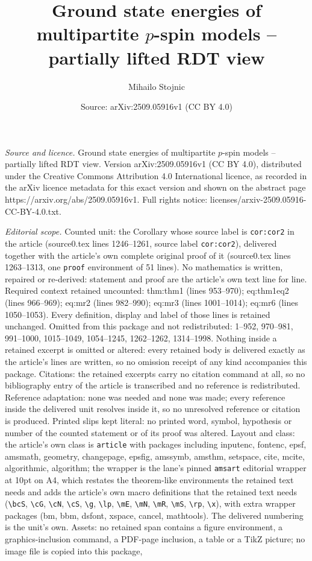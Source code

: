 \documentclass[10pt,a4paper]{amsart}
\title[Ground state energies of multipartite $p$-spin models -- par]{Ground state energies of multipartite $p$-spin models -- partially lifted RDT view}
\author{Mihailo Stojnic}
\date{Source: arXiv:2509.05916v1 (CC BY 4.0)}
\begin{document}
\maketitle

\noindent\emph{Source and licence.} Ground state energies of multipartite $p$-spin models -- partially lifted RDT view. Version arXiv:2509.05916v1 (CC BY 4.0), distributed under the Creative Commons Attribution 4.0 International licence, as recorded in the arXiv licence metadata for this exact version and shown on the abstract page https://arxiv.org/abs/2509.05916v1. Full rights notice: licenses/arxiv-2509.05916-CC-BY-4.0.txt.\par\smallskip

\noindent\textit{Editorial scope.} Counted unit: the Corollary whose source label is \texttt{cor:cor2} in the article (source0.tex lines 1246--1261, source label \texttt{cor:cor2}), delivered together with the article's own complete original proof of it (source0.tex lines 1263--1313, one \texttt{proof} environment of 51 lines). No mathematics is written, repaired or re-derived: statement and proof are the article's own text line for line. Required context retained uncounted: thm:thm1 (lines 953--970); eq:thm1eq2 (lines 966--969); eq:mr2 (lines 982--990); eq:mr3 (lines 1001--1014); eq:mr6 (lines 1050--1053). Every definition, display and label of those lines is retained unchanged. Omitted from this package and not redistributed: 1--952, 970--981, 991--1000, 1015--1049, 1054--1245, 1262--1262, 1314--1998. Nothing inside a retained excerpt is omitted or altered: every retained body is delivered exactly as the article's lines are written, so no omission receipt of any kind accompanies this package. Citations: the retained excerpts carry no citation command at all, so no bibliography entry of the article is transcribed and no reference is redistributed. Reference adaptation: none was needed and none was made; every reference inside the delivered unit resolves inside it, so no unresolved reference or citation is produced. Printed slips kept literal: no printed word, symbol, hypothesis or number of the counted statement or of its proof was altered. Layout and class: the article's own class is \texttt{article} with packages including inputenc, fontenc, epsf, amsmath, geometry, changepage, epsfig, amssymb, amsthm, setspace, cite, mcite, algorithmic, algorithm; the wrapper is the lane's pinned \texttt{amsart} editorial wrapper at 10pt on A4, which restates the theorem-like environments the retained text needs and adds the article's own macro definitions that the retained text needs (\texttt{\textbackslash bcS}, \texttt{\textbackslash cG}, \texttt{\textbackslash cN}, \texttt{\textbackslash cS}, \texttt{\textbackslash g}, \texttt{\textbackslash lp}, \texttt{\textbackslash mE}, \texttt{\textbackslash mN}, \texttt{\textbackslash mR}, \texttt{\textbackslash mS}, \texttt{\textbackslash rp}, \texttt{\textbackslash x}), with extra wrapper packages (bm, bbm, dsfont, xspace, cancel, mathtools). The delivered numbering is the unit's own. Assets: no retained span contains a figure environment, a graphics-inclusion command, a PDF-page inclusion, a table or a TikZ picture; no image file is copied into this package, 
\end{document}

